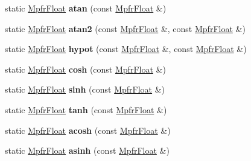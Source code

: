 \begin{DoxyCompactItemize}
\item 
\mbox{\label{class_mpfr_float_aeb0e653a06e24a90f1b537a5f197924e}} 
static \hyperlink{class_mpfr_float}{Mpfr\+Float} {\bfseries atan} (const \hyperlink{class_mpfr_float}{Mpfr\+Float} \&)
\item 
\mbox{\label{class_mpfr_float_a75e977a7b3d177945ff6066fd0d5886d}} 
static \hyperlink{class_mpfr_float}{Mpfr\+Float} {\bfseries atan2} (const \hyperlink{class_mpfr_float}{Mpfr\+Float} \&, const \hyperlink{class_mpfr_float}{Mpfr\+Float} \&)
\item 
\mbox{\label{class_mpfr_float_a804a4854eed469b8295a49a810737ca2}} 
static \hyperlink{class_mpfr_float}{Mpfr\+Float} {\bfseries hypot} (const \hyperlink{class_mpfr_float}{Mpfr\+Float} \&, const \hyperlink{class_mpfr_float}{Mpfr\+Float} \&)
\item 
\mbox{\label{class_mpfr_float_a923e51dab6f34eea90716225a5e5314c}} 
static \hyperlink{class_mpfr_float}{Mpfr\+Float} {\bfseries cosh} (const \hyperlink{class_mpfr_float}{Mpfr\+Float} \&)
\item 
\mbox{\label{class_mpfr_float_a890f6cb75fcbd4b335f52b44de7a97d0}} 
static \hyperlink{class_mpfr_float}{Mpfr\+Float} {\bfseries sinh} (const \hyperlink{class_mpfr_float}{Mpfr\+Float} \&)
\item 
\mbox{\label{class_mpfr_float_add65d7445d86d0968ceea774e16fb3c2}} 
static \hyperlink{class_mpfr_float}{Mpfr\+Float} {\bfseries tanh} (const \hyperlink{class_mpfr_float}{Mpfr\+Float} \&)
\item 
\mbox{\label{class_mpfr_float_a755aff5a0700854e6609b4d6011dd392}} 
static \hyperlink{class_mpfr_float}{Mpfr\+Float} {\bfseries acosh} (const \hyperlink{class_mpfr_float}{Mpfr\+Float} \&)
\item 
\mbox{\label{class_mpfr_float_a28580eb116add56d645d0139db189616}} 
static \hyperlink{class_mpfr_float}{Mpfr\+Float} {\bfseries asinh} (const \hyperlink{class_mpfr_float}{Mpfr\+Float} \&)
\item 
\mbox{\label{class_mpfr_float_ae4d2afb79d933fd346c4dd0b6f76e10b}} 

\end{DoxyCompactItemize}

